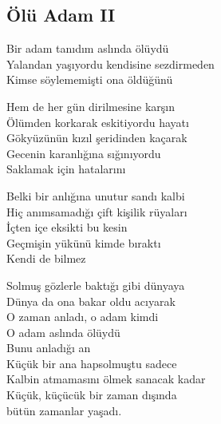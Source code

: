 \subsection{Ölü Adam II}

Bir adam tanıdım aslında ölüydü \\
Yalandan yaşıyordu kendisine sezdirmeden \\
Kimse söylememişti ona öldüğünü

\noindent\newline
Hem de her gün dirilmesine karşın \\
Ölümden korkarak eskitiyordu hayatı \\
Gökyüzünün kızıl şeridinden kaçarak \\
Gecenin karanlığına sığınıyordu \\
Saklamak için hatalarını

\noindent\newline
Belki bir anlığına unutur sandı kalbi \\
Hiç anımsamadığı çift kişilik rüyaları \\
İçten içe eksikti bu kesin \\
Geçmişin yükünü kimde bıraktı \\
Kendi de bilmez

\noindent\newline
Solmuş gözlerle baktığı gibi dünyaya \\
Dünya da ona bakar oldu acıyarak \\
O zaman anladı, o adam kimdi \\
O adam aslında ölüydü \\
Bunu anladığı an \\
Küçük bir ana hapsolmuştu sadece \\
Kalbin atmamasını ölmek sanacak kadar \\
Küçük, küçücük bir zaman dışında \\
bütün zamanlar yaşadı.